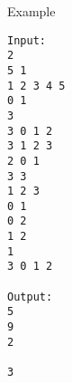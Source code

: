 Example
\begin{verbatim}
Input:
2
5 1
1 2 3 4 5
0 1
3
3 0 1 2
3 1 2 3
2 0 1
3 3
1 2 3
0 1
0 2
1 2
1
3 0 1 2

Output:
5
9
2

3 
\end{verbatim}